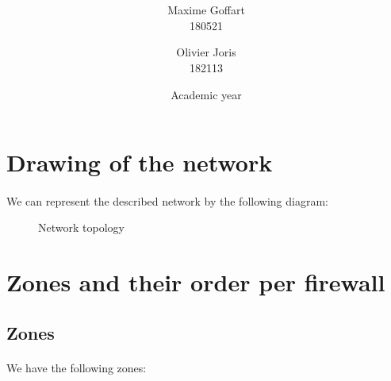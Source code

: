 \documentclass[a4paper, 11pt, oneside]{article}
\title{\ClassName\\\vspace*{0.8cm}\ProjectName\vspace{1cm}}
\author{Maxime Goffart \\180521 \and Olivier Joris\\182113}
\date{\vspace{1cm}Academic year \AcademicYear}
\begin{document}

\begin{titlingpage}
{\let\newpage\relax\maketitle}
\end{titlingpage}

\newpage


\section{Drawing of the network}
\paragraph{}We can represent the described network by the following diagram:

\begin{figure}[H]
  \caption{Network topology}
  \label{fig:key}
\end{figure}

\section{Zones and their order per firewall}

\subsection{Zones}
\paragraph{}We have the following zones:
\end{document}
